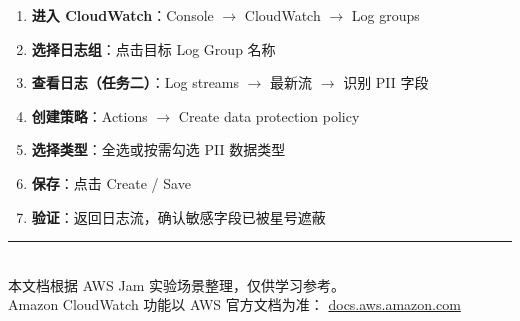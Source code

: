 \documentclass[12pt, a4paper]{article}
\begin{document}
\begin{enumerate}[leftmargin=2em, label=\textbf{Step \arabic*.}]
  \item \textbf{进入 CloudWatch}：Console $\rightarrow$ CloudWatch $\rightarrow$ Log groups
  \item \textbf{选择日志组}：点击目标 Log Group 名称
  \item \textbf{查看日志（任务二）}：Log streams $\rightarrow$ 最新流 $\rightarrow$ 识别 PII 字段
  \item \textbf{创建策略}：Actions $\rightarrow$ Create data protection policy
  \item \textbf{选择类型}：全选或按需勾选 PII 数据类型
  \item \textbf{保存}：点击 Create / Save
  \item \textbf{验证}：返回日志流，确认敏感字段已被星号遮蔽
\end{enumerate}

\vspace{1cm}

\begin{center}
{\color{awsorange}\rule{0.5\linewidth}{2pt}}\\[0.5em]
{\color{gray}\small 本文档根据 AWS Jam 实验场景整理，仅供学习参考。}\\
{\color{gray}\small Amazon CloudWatch 功能以 AWS 官方文档为准：
  \href{https://docs.aws.amazon.com/AmazonCloudWatch/latest/logs/cloudwatch-logs-data-protection-policies.html}
       {docs.aws.amazon.com}}
\end{center}
\end{document}
